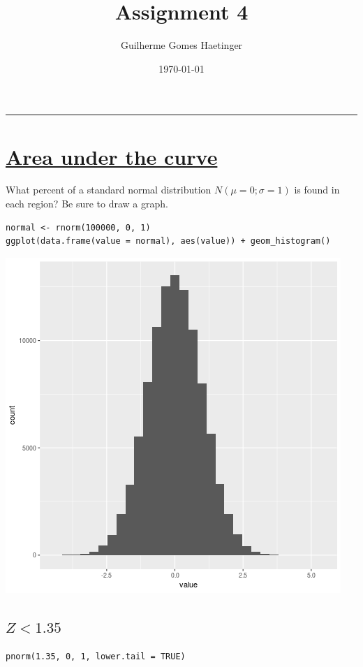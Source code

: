 \documentclass[11pt]{article}
\author{Guilherme Gomes Haetinger}
\date{\today}
\title{\huge Assignment 4}
\begin{document}
\maketitle
\thispagestyle{empty}

\noindent\rule{\textwidth}{0.5pt}

\section{\underline{Area under the curve}}
\label{sec:org0eededf}
What percent of a standard normal distribution \(N(\mu = 0; \sigma = 1)\) is found in each region? Be sure to draw a graph.
\begin{verbatim}
normal <- rnorm(100000, 0, 1)
ggplot(data.frame(value = normal), aes(value)) + geom_histogram()
\end{verbatim}

\begin{center}
\includegraphics[width=.9\linewidth]{normal.png}
\end{center}

\subsection{\(Z < 1.35\)}
\label{sec:org280712c}

\begin{verbatim}
pnorm(1.35, 0, 1, lower.tail = TRUE)
\end{verbatim}
\end{document}
